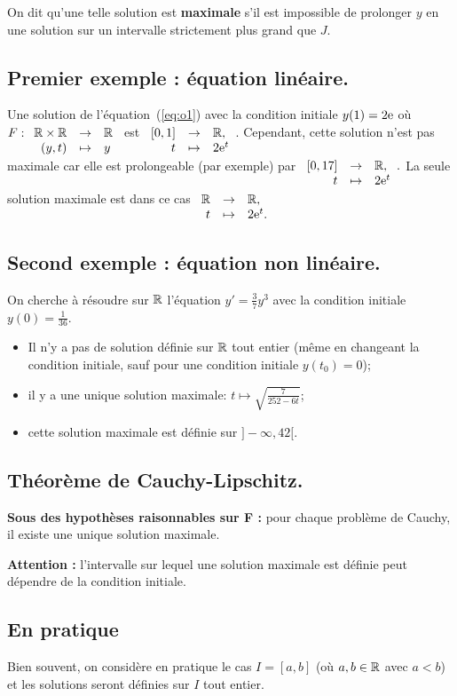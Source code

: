 On dit qu'une telle solution est \textbf{maximale} s'il est
impossible de prolonger $y$ en une solution sur un intervalle strictement
plus grand que $J$.

\subsection{Premier exemple : équation linéaire.}
Une solution de l'équation~(\ref{eq:o1}) avec la condition initiale $y(1)=2
\mathrm{e}$ où $  F:\begin{array}[t]{rcl} \mathbb{R}\times \mathbb{R} & \rightarrow & \mathbb{R}\\ (y,t) & \mapsto & y\\ \end{array}$ est $  \begin{array}[t]{rcl} [0,1] & \rightarrow & \mathbb{R},\\ t & \mapsto & 2 \mathrm{e}^{t}\\ \end{array}$. 
Cependant, cette solution n'est pas maximale car elle est prolongeable (par exemple) par 
$ \begin{array}[t]{rcl} [0,17] & \rightarrow & \mathbb{R},\\ t & \mapsto & 2 \mathrm{e}^{t}\\ \end{array}.
$
La seule solution maximale est dans ce cas $  \begin{array}[t]{rcl} \mathbb{R} & \rightarrow & \mathbb{R},\\ t & \mapsto & 2\mathrm{e}^{t}.\\ \end{array}$

\subsection{Second exemple : équation non linéaire.}

On cherche à résoudre sur $\mathbb{R}$ l'équation $  y' = \frac{3}{7}y^{3}$ 
avec la condition initiale $y(0)=\frac{1}{36}$.

\begin{itemize}
\item Il n'y a pas de solution définie sur $\mathbb{R}$ tout entier (même en
  changeant la condition initiale, sauf pour une condition initiale $y(t_{0})=0$);
\item il y a une unique solution maximale: $t\mapsto\sqrt{\frac{7}{252 - 6t}}$;
\item cette solution maximale est définie sur $]-\infty, 42[$.
\end{itemize}
\subsection{Théorème de Cauchy-Lipschitz.}

\textbf{Sous des hypothèses raisonnables sur F :} pour chaque problème de Cauchy, il existe une unique solution
maximale.

\textbf{Attention :} l'intervalle sur lequel une solution maximale est définie peut dépendre de
la condition initiale.

\subsection{En pratique}

Bien souvent, on considère en pratique le cas $I=[a,b]$ (où $a,b\in\mathbb{R}$ avec $a<b$) et les
solutions seront définies sur $I$ tout entier.

